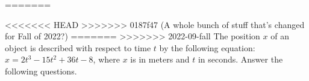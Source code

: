\documentclass{../../oss-apphys-exam}
\newcounter{lastmc}
\begin{document}
\begin{questions}
=======
%

\begin{questions}
  \setcounter{question}{\value{lastmc}}
  
<<<<<<< HEAD
>>>>>>> 0187f47 (A whole bunch of stuff that's changed for Fall of 2022?)
=======
>>>>>>> 2022-09-fall
  \question The position $x$ of an object is described with respect to time $t$
  by the following equation: $x=2t^3-15t^2+36t-8$, where $x$ is in meters and
  $t$ in seconds. Answer the following questions.
\end{questions}
\end{questions}
\end{document}
